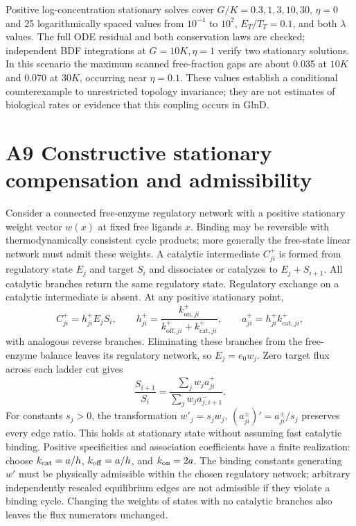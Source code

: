 \documentclass[11pt]{article}
\begin{document}
Positive log-concentration stationary solves cover $G/K=0.3,1,3,10,30$, $\eta=0$ and 25 logarithmically spaced values from $10^{-4}$ to $10^2$, $E_T/T_T=0.1$, and both $\lambda$ values. The full ODE residual and both conservation laws are checked; independent BDF integrations at $G=10K,\eta=1$ verify two stationary solutions. In this scenario the maximum scanned free-fraction gaps are about 0.035 at $10K$ and 0.070 at $30K$, occurring near $\eta=0.1$. These values establish a conditional counterexample to unrestricted topology invariance; they are not estimates of biological rates or evidence that this coupling occurs in GlnD.

\clearpage
\section*{A9 Constructive stationary compensation and admissibility}

Consider a connected free-enzyme regulatory network with a positive stationary weight vector $w(x)$ at fixed free ligands $x$. Binding may be reversible with thermodynamically consistent cycle products; more generally the free-state linear network must admit these weights. A catalytic intermediate $C_{ji}^{+}$ is formed from regulatory state $E_j$ and target $S_i$ and dissociates or catalyzes to $E_j+S_{i+1}$. All catalytic branches return the same regulatory state. Regulatory exchange on a catalytic intermediate is absent. At any positive stationary point,
\[
 C_{ji}^{+}=h_{ji}^{+}E_jS_i,\qquad
 h_{ji}^{+}=\frac{k_{\mathrm{on},ji}^{+}}{k_{\mathrm{off},ji}^{+}+k_{\mathrm{cat},ji}^{+}},\qquad
 a_{ji}^{+}=h_{ji}^{+}k_{\mathrm{cat},ji}^{+},
\]
with analogous reverse branches. Eliminating these branches from the free-enzyme balance leaves its regulatory network, so $E_j=e_0w_j$. Zero target flux across each ladder cut gives
\[
 \frac{S_{i+1}}{S_i}=\frac{\sum_jw_ja_{ji}^{+}}{\sum_jw_ja_{j,i+1}^{-}}.
\]
For constants $s_j>0$, the transformation $w'_j=s_jw_j$, $(a_{ji}^{\pm})'=a_{ji}^{\pm}/s_j$ preserves every edge ratio. This holds at stationary state without assuming fast catalytic binding. Positive specificities and association coefficients have a finite realization: choose $k_{\rm cat}=a/h$, $k_{\rm off}=a/h$, and $k_{\rm on}=2a$. The binding constants generating $w'$ must be physically admissible within the chosen regulatory network; arbitrary independently rescaled equilibrium edges are not admissible if they violate a binding cycle. Changing the weights of states with no catalytic branches also leaves the flux numerators unchanged.
\end{document}
